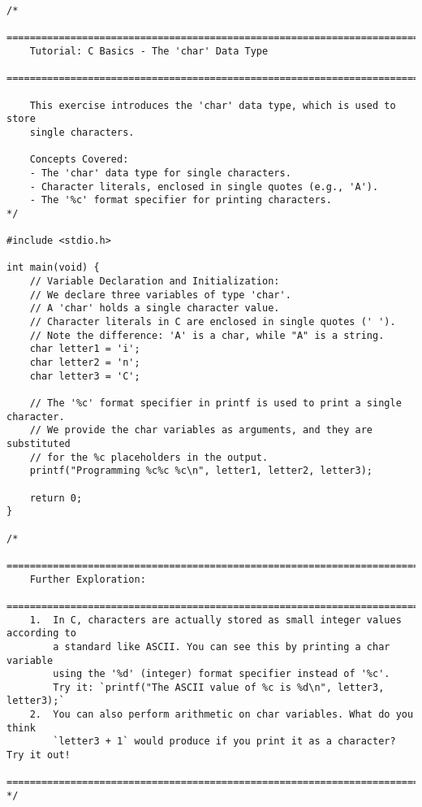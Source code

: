 \documentclass[11pt]{book}
\begin{document}
\begin{verbatim}
/*
    ================================================================================
    Tutorial: C Basics - The 'char' Data Type
    ================================================================================

    This exercise introduces the 'char' data type, which is used to store
    single characters.

    Concepts Covered:
    - The 'char' data type for single characters.
    - Character literals, enclosed in single quotes (e.g., 'A').
    - The '%c' format specifier for printing characters.
*/

#include <stdio.h>

int main(void) {
    // Variable Declaration and Initialization:
    // We declare three variables of type 'char'.
    // A 'char' holds a single character value.
    // Character literals in C are enclosed in single quotes (' ').
    // Note the difference: 'A' is a char, while "A" is a string.
    char letter1 = 'i';
    char letter2 = 'n';
    char letter3 = 'C';

    // The '%c' format specifier in printf is used to print a single character.
    // We provide the char variables as arguments, and they are substituted
    // for the %c placeholders in the output.
    printf("Programming %c%c %c\n", letter1, letter2, letter3);

    return 0;
}

/*
    ================================================================================
    Further Exploration:
    ================================================================================
    1.  In C, characters are actually stored as small integer values according to
        a standard like ASCII. You can see this by printing a char variable
        using the '%d' (integer) format specifier instead of '%c'.
        Try it: `printf("The ASCII value of %c is %d\n", letter3, letter3);`
    2.  You can also perform arithmetic on char variables. What do you think
        `letter3 + 1` would produce if you print it as a character? Try it out!
    ================================================================================
*/

\end{verbatim}
\clearpage
\end{document}
